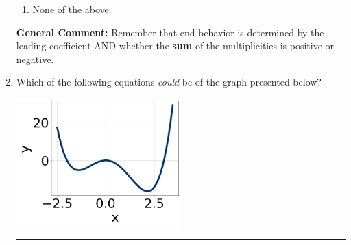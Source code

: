 \documentclass{extbook}[14pt]
\newcommand{\litem}[1]{\item #1

\rule{\textwidth}{0.4pt}}
\begin{document}
\begin{enumerate}
{\begin{enumerate}[label=\Alph*.]
\item None of the above.\end{enumerate}
\textbf{General Comment:} Remember that end behavior is determined by the leading coefficient AND whether the \textbf{sum} of the multiplicities is positive or negative.
}
\litem{
Which of the following equations \textit{could} be of the graph presented below?

\begin{center}
    \includegraphics[width=0.5\textwidth]{../Figures/polyGraphToFunctionCopyA.png}
\end{center}


}
\end{enumerate}
\end{document}
